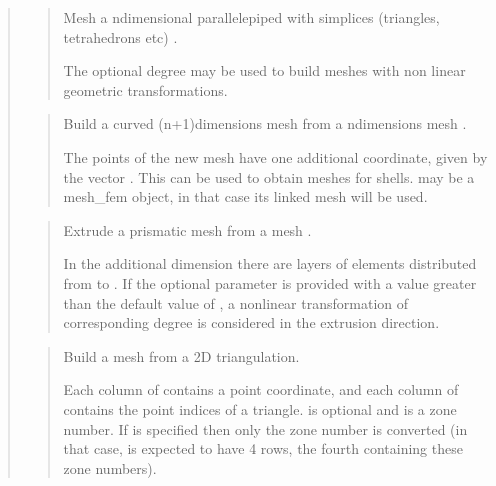 \documentclass[a4paper,11pt,english]{sphinxmanual}
\begin{document}
\begin{quote}
\begin{quote}
\sphinxAtStartPar
Mesh a n\sphinxhyphen{}dimensional parallelepiped with simplices (triangles,
tetrahedrons etc) .

\sphinxAtStartPar
The optional degree may be used to build meshes with non linear
geometric transformations.
\end{quote}

\sphinxAtStartPar
{}
\begin{quote}

\sphinxAtStartPar
Build a curved (n+1)\sphinxhyphen{}dimensions mesh from a n\sphinxhyphen{}dimensions mesh .

\sphinxAtStartPar
The points of the new mesh have one additional coordinate, given by
the vector . This can be used to obtain meshes for shells.  may
be a mesh\_fem object, in that case its linked mesh will be used.
\end{quote}

\sphinxAtStartPar
{}
\begin{quote}

\sphinxAtStartPar
Extrude a prismatic mesh  from a mesh .

\sphinxAtStartPar
In the additional dimension there are  layers of elements
distributed from  to .
If the optional parameter  is provided with a value greater
than the default value of , a non\sphinxhyphen{}linear transformation of
corresponding degree is considered in the extrusion direction.
\end{quote}

\sphinxAtStartPar
{}
\begin{quote}

\sphinxAtStartPar
Build a mesh from a 2D triangulation.

\sphinxAtStartPar
Each column of  contains a point coordinate, and each column of 
contains the point indices of a triangle.  is optional and is a
zone number. If  is specified then only the zone number  is
converted (in that case,  is expected to have 4 rows, the fourth
containing these zone numbers).


\end{quote}
\end{quote}
\end{document}
